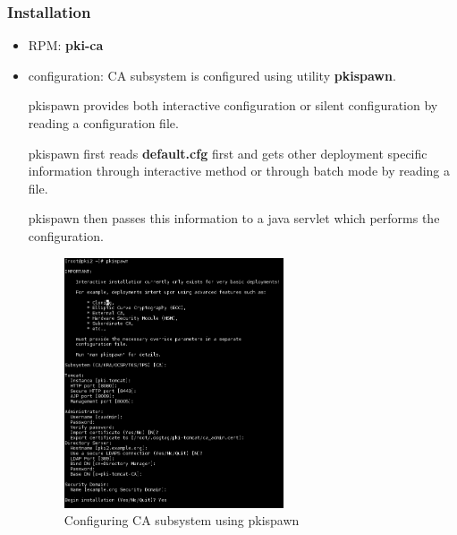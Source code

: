 \documentclass[a4paper]{article}
\begin{document}
\subsubsection{Installation}
    \begin{itemize}
        \item RPM: \textrm{\textbf{pki-ca}}
        \item configuration:  CA subsystem is configured using utility \textbf{pkispawn}. 
            
            pkispawn provides both interactive configuration  or silent configuration by reading a configuration file. 
            
            pkispawn first reads \textbf{default.cfg} first and gets other deployment specific information through interactive method
            or through batch mode by reading a file. 

            pkispawn then passes this information to a java servlet which performs the configuration. 
        \begin{figure}[ht!]
            \centering
            \includegraphics[width=65mm]{pkispawn-ca.png}
            \caption{Configuring CA subsystem using pkispawn}
        \end{figure}
    \end{itemize}
\end{document}
